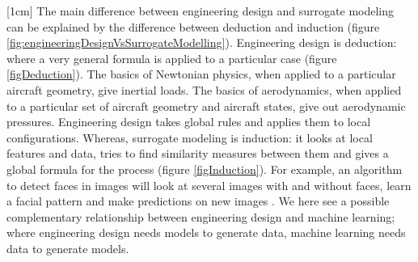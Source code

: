 [1cm]
The main difference between engineering design and surrogate modeling can be explained by the difference between deduction and induction \cite{domingos2012few} (figure \ref{fig:engineeringDesignVsSurrogateModelling}). Engineering design is deduction: where a very general formula is applied to a particular case (figure \ref{figDeduction}). The basics of Newtonian physics, when applied to a particular aircraft geometry, give inertial loads. The basics of aerodynamics, when applied to a particular set of aircraft geometry and aircraft states, give out aerodynamic pressures. Engineering design takes global rules and applies them to local configurations. Whereas, surrogate modeling is induction: it looks at local features and data, tries to find similarity measures between them and gives a global formula for the process (figure \ref{figInduction}). For example, an algorithm to detect faces in images will look at several images with and without faces, learn a facial pattern and make predictions on new images \cite{marszalek2007semantic}. We here see a possible complementary relationship between engineering design and machine learning; where engineering design needs models to generate data, machine learning needs data to generate models.

